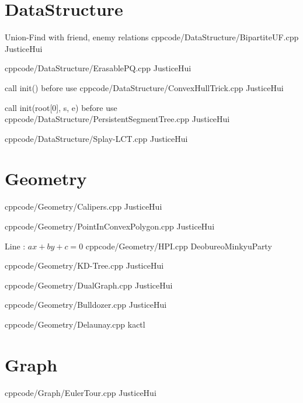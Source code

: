 \documentclass[landscape, 8pt, a4paper, oneside, twocolumn]{extarticle}
\begin{document}
\maketitlepage

\pagebreak 

\section{DataStructure}

{Union-Find with friend, enemy relations}{}
{cpp}{code/DataStructure/BipartiteUF.cpp}
{JusticeHui}

{}{}
{cpp}{code/DataStructure/ErasablePQ.cpp}
{JusticeHui}

{call init() before use}{}
{cpp}{code/DataStructure/ConvexHullTrick.cpp}
{JusticeHui}

{call init(root[0], s, e) before use}{}
{cpp}{code/DataStructure/PersistentSegmentTree.cpp}
{JusticeHui}

{}{}
{cpp}{code/DataStructure/Splay-LCT.cpp}
{JusticeHui}

\section{Geometry}

{}{}
{cpp}{code/Geometry/Calipers.cpp}
{JusticeHui}

{}{}
{cpp}{code/Geometry/PointInConvexPolygon.cpp}
{JusticeHui}

{Line : $ax + by + c = 0$}{}
{cpp}{code/Geometry/HPI.cpp}
{DeobureoMinkyuParty}

{}{}
{cpp}{code/Geometry/KD-Tree.cpp}
{JusticeHui}

{}{}
{cpp}{code/Geometry/DualGraph.cpp}
{JusticeHui}

{}{}
{cpp}{code/Geometry/Bulldozer.cpp}
{JusticeHui}

{}{}
{cpp}{code/Geometry/Delaunay.cpp}
{kactl}

\section{Graph}

{}{}
{cpp}{code/Graph/EulerTour.cpp}
{JusticeHui}
\end{document}
